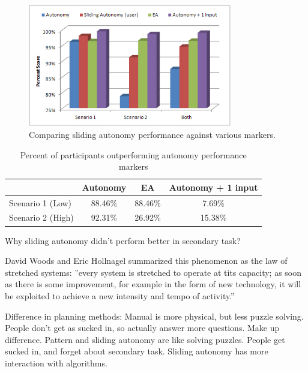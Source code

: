 \documentclass[journal]{IEEEtran}
\begin{document}
\begin{figure}
\centering
\includegraphics[width=3.5in]{PerformanceMarkers.JPG}
\caption{Comparing sliding autonomy performance against various markers.}
\label{PerformanceMarkers}
\end{figure}



\begin{table}
\caption{Percent of participants outperforming autonomy performance markers}
	\centering
		\begin{tabular}
			{|l|c|c|c|}
			\hline
			 & Autonomy & EA & Autonomy + 1 input \\
			\hline
			Scenario 1 (Low) & 88.46\% & 88.46\% & 7.69\% \\
			\hline
			Scenario 2 (High) & 92.31\% & 26.92\% & 15.38\% \\
			\hline			
		\end{tabular}
\label{CompareToMarkers}
\end{table}



Why sliding autonomy didn't perform better in secondary task?

David Woods and Eric Hollnagel summarized this phenomenon as the law of stretched systems: ''every system is stretched to operate at tits capacity; as soon as there is some improvement, for example in the form of new technology, it will be exploited to achieve a new intensity and tempo of activity.''  ~\cite{Woods2006Joint}

Difference in planning methods: 
Manual is more physical, but less puzzle solving. People don't get as sucked in, so actually answer more questions. Make up difference.
Pattern and sliding autonomy are like solving puzzles. People get sucked in, and forget about secondary task.
Sliding autonomy has more interaction with algorithms.
\end{document}
